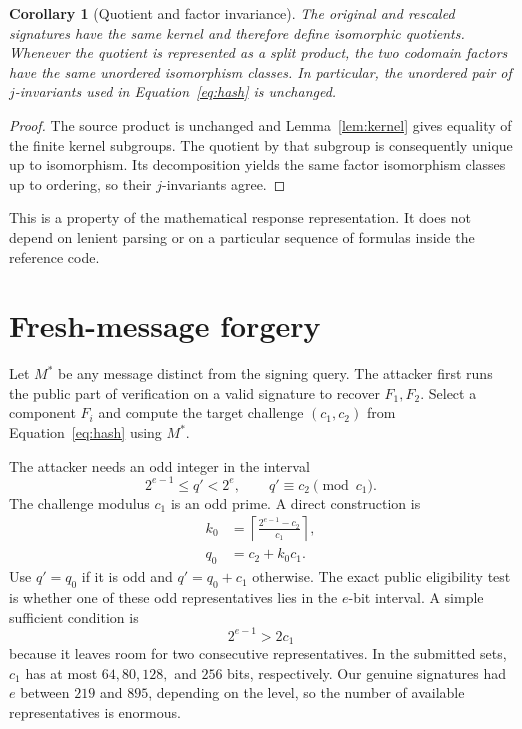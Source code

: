 \documentclass[11pt,a4paper]{article}
\newtheorem{corollary}[theorem]{Corollary}
\begin{document}
\begin{corollary}[Quotient and factor invariance]
The original and rescaled signatures have the same kernel and therefore define
isomorphic quotients. Whenever the quotient is represented as a split product,
the two codomain factors have the same unordered isomorphism classes. In
particular, the unordered pair of $j$-invariants used in
Equation~\eqref{eq:hash} is unchanged.
\end{corollary}

\begin{proof}
The source product is unchanged and Lemma~\ref{lem:kernel} gives equality of
the finite kernel subgroups. The quotient by that subgroup is consequently
unique up to isomorphism. Its decomposition yields the same factor isomorphism
classes up to ordering, so their $j$-invariants agree.
\end{proof}

This is a property of the mathematical response representation. It does not
depend on lenient parsing or on a particular sequence of formulas inside the
reference code.

\section{Fresh-message forgery}

Let $M^*$ be any message distinct from the signing query. The attacker first
runs the public part of verification on a valid signature to recover
$F_1,F_2$. Select a component $F_i$ and compute the target challenge
$(c_1,c_2)$ from Equation~\eqref{eq:hash} using $M^*$.

The attacker needs an odd integer in the interval
\begin{equation}
       2^{e-1}\le q'<2^e,\qquad q'\equiv c_2\pmod{c_1}.
 \label{eq:qprime}
\end{equation}
The challenge modulus $c_1$ is an odd prime. A direct construction is
\begin{align}
 k_0&=\left\lceil\frac{2^{e-1}-c_2}{c_1}\right\rceil,\\
 q_0&=c_2+k_0c_1.
\end{align}
Use $q'=q_0$ if it is odd and $q'=q_0+c_1$ otherwise. The exact public
eligibility test is whether one of these odd representatives lies in the
$e$-bit interval. A simple sufficient condition is
\begin{equation}
                         2^{e-1}>2c_1
 \label{eq:room}
\end{equation}
because it leaves room for two consecutive representatives. In the submitted
sets, $c_1$ has at most
$64,80,128,$ and $256$ bits, respectively. Our genuine signatures had
$e$ between $219$ and $895$, depending on the level, so the number of
available representatives is enormous.
\end{document}
